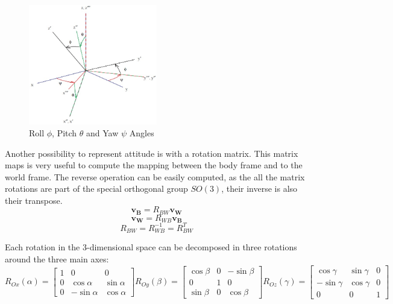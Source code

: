 \documentclass[a4paper, 12pt]{report}
\begin{document}
\begin{figure}[htbp]
\centering
\includegraphics[width=0.5\textwidth]{Images/attitude}
\captionsetup[subfloat]{labelformat=empty}
\caption{Roll $\phi$, Pitch $\theta$ and Yaw $\psi$ Angles}
\label{fig:attitude}
\end{figure}

Another possibility to represent attitude is with a rotation matrix. This matrix maps is very useful to compute the mapping between the body frame and to the world frame. The reverse operation can be easily computed, as the all the matrix rotations are part of the special orthogonal group $SO(3)$, their inverse is also their transpose.
\[ \boldsymbol{v_B} = R_{BW} \boldsymbol{v_W}\]
\[ \boldsymbol{v_W} = R_{WB} \boldsymbol{v_B}\]
\[ R_{BW} = R_{WB}^{-1} = R_{BW}^T \]

Each rotation in the 3-dimensional space can be decomposed in three rotations around the three main axes:
\[R_{Ox}(\alpha)  = \begin{bmatrix} 1 & 0 & 0 \\ 0 & \cos{\alpha} & \sin{\alpha} \\ 0 & -\sin{\alpha} & \cos{\alpha}  \end{bmatrix} R_{Oy}(\beta)  = \begin{bmatrix} \cos{\beta} & 0 & -\sin{\beta} \\ 0 & 1 & 0 \\ \sin{\beta} & 0 & \cos{\beta}  \end{bmatrix} R_{Oz}(\gamma)  = \begin{bmatrix} \cos{\gamma} & \sin{\gamma} & 0 \\ -\sin{\gamma} & \cos{\gamma} & 0 \\ 0 & 0 & 1  \end{bmatrix} \]
\end{document}
